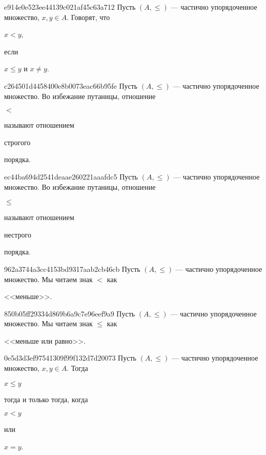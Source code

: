 \begin{note}{e914e0e523ee44139c021af45c63a712}
    Пусть \({ (A, \leqslant) }\) --- частично упорядоченное множество, \({ x, y \in A }\).
    Говорят, что \begin{icloze}{2}\({ x < y }\),\end{icloze} если \begin{icloze}{1}\({ x \leqslant y }\) и \({ x \neq y }\).\end{icloze}
\end{note}

\begin{note}{c264501d4458400e8b0073eac66b95fe}
    Пусть \({ (A, \leqslant) }\) --- частично упорядоченное множество.
    Во избежание путаницы, отношение \begin{icloze}{2}\({ < }\)\end{icloze} называют отношением \begin{icloze}{1}строгого\end{icloze} порядка.
\end{note}

\begin{note}{ec44ba694d2541deaae260221aaafdc5}
    Пусть \({ (A, \leqslant) }\) --- частично упорядоченное множество.
    Во избежание путаницы, отношение \begin{icloze}{2}\({ \leqslant }\)\end{icloze} называют отношением \begin{icloze}{1}нестрого\end{icloze} порядка.
\end{note}

\begin{note}{962a3744a3cc4153bd9317aab2cb46cb}
    Пусть \({ (A, \leqslant) }\) --- частично упорядоченное множество.
    Мы читаем знак \({ < }\) как \begin{icloze}{1}<<меньше>>.\end{icloze}
\end{note}

\begin{note}{850b05ff29334d869b6a9c7e96eef9a9}
    Пусть \({ (A, \leqslant) }\) --- частично упорядоченное множество.
    Мы читаем знак \({ \leqslant }\) как \begin{icloze}{1}<<меньше или равно>>.\end{icloze}
\end{note}

\begin{note}{0e5d3d3ef97541309f99f132d7d20073}
    Пусть \({ (A, \leqslant) }\) --- частично упорядоченное множество, \({ x, y \in A }\).
    Тогда \begin{icloze}{2}\({ x \leqslant y }\)\end{icloze} \begin{icloze}{3}тогда и только тогда, когда\end{icloze} \begin{icloze}{1}\({ x < y }\)\end{icloze} или \begin{icloze}{1}\({ x = y }\).\end{icloze}
\end{note}

